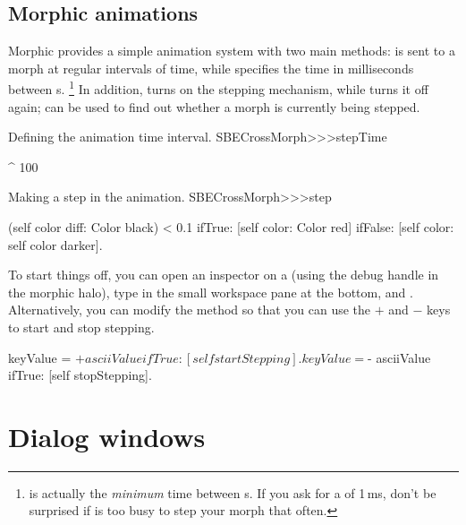 \documentclass[a4paper,10pt,twoside]{book}
\begin{document}
\subsection{Morphic animations}

Morphic provides a simple animation system with two main methods:  is sent to a morph at regular intervals of time, while  specifies the time in milliseconds between s.%
\footnote{ is actually the \emph{minimum} time between s.
	If you ask for a  of 1\,ms, don't be surprised if \sq is too busy to step your morph that often.}
In addition,  turns on the stepping mechanism, while  turns it off again;   can be used to find out whether a morph is currently being stepped.

\begin{method}{Defining the animation time interval.}
SBECrossMorph>>>stepTime

	^ 100
\end{method}
\begin{method}{Making a step in the animation.}
SBECrossMorph>>>step

	(self color diff: Color black) < 0.1
		ifTrue: [self color: Color red]
		ifFalse: [self color: self color darker].
\end{method}
\noindent
To start things off, you can open an inspector on a  (using the debug handle \debugHandle{} in the morphic halo), type  in the small workspace pane at the bottom, and .
Alternatively, you can modify the  method so that you can use the $+$ and $-$ keys to start and stop stepping. 


\begin{code}{}
	keyValue = $+ asciiValue
		ifTrue: [self startStepping].
	keyValue = $- asciiValue
		ifTrue: [self stopStepping].
\end{code}


\section{Dialog windows}
\end{document}
